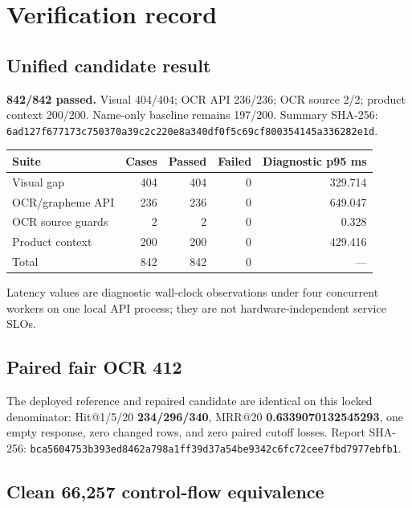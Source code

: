 \documentclass[10pt,oneside]{book}
\begin{document}
\chapter{Verification record}

\section{Unified candidate result}

\begin{resultbox}[title=Run 20260822T142857Z]
\textbf{842/842 passed.} Visual 404/404; OCR API 236/236; OCR source 2/2;
product context 200/200. Name-only baseline remains 197/200. Summary SHA-256:
\texttt{6ad127f677173c750370a39c2c220e8a340df0f5c69cf800354145a336282e1d}.
\end{resultbox}

\begin{longtable}{@{}p{2.15in}rrrr@{}}
\toprule
Suite & Cases & Passed & Failed & Diagnostic p95 ms \\
\midrule
Visual gap & 404 & 404 & 0 & 329.714 \\
OCR/grapheme API & 236 & 236 & 0 & 649.047 \\
OCR source guards & 2 & 2 & 0 & 0.328 \\
Product context & 200 & 200 & 0 & 429.416 \\
\midrule
Total & 842 & 842 & 0 & --- \\
\bottomrule
\end{longtable}

Latency values are diagnostic wall-clock observations under four concurrent
workers on one local API process; they are not hardware-independent service SLOs.

\section{Paired fair OCR 412}

The deployed reference and repaired candidate are identical on this locked
denominator: Hit@1/5/20 \textbf{234/296/340}, MRR@20
\textbf{0.6339070132545293}, one empty response, zero changed rows, and zero
paired cutoff losses. Report SHA-256:
\texttt{bca5604753b393ed8462a798a1ff39d37a54be9342c6fc72cee7fbd7977ebfb1}.

\section{Clean 66,257 control-flow equivalence}
\end{document}
